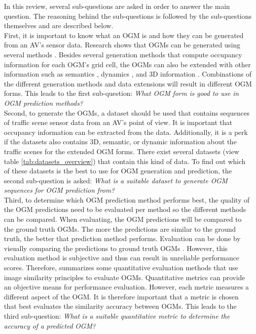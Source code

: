 In this review, several sub-questions are asked in order to answer the main question. The reasoning behind the sub-questions is followed by the sub-questions themselves and are described below. \\ 

First, it is important to know what an \gls{OGM} is and how they can be generated from an \gls{AV}'s sensor data. Research shows that \glspl{OGM} can be generated using several methods \cite{collins2007occupancy} \cite{ribo2001comparison} \cite{thrun2003learning}. Besides several generation methods that compute occupancy information for each \gls{OGM}'s grid cell, the \glspl{OGM} can also be extended with other information such as semantics \cite{lu2019monocular}, dynamics \cite{nuss2018random}, and 3D information \cite{degerman20163d}. Combinations of the different generation methods and data extensions will result in different \gls{OGM} forms. This leads to the first sub-question: \textit{What \gls{OGM} form is good to use in \gls{OGM} prediction methods?} \\

Second, to generate the \glspl{OGM}, a dataset should be used that contains sequences of traffic scene sensor data from an \gls{AV}'s point of view. It is important that occupancy information can be extracted from the data. Additionally, it is a perk if the datasets also contains 3D, semantic, or dynamic information about the traffic scenes for the extended \gls{OGM} forms. There exist several datasets (view table \ref{tab:datasets_overview}) that contain this kind of data. To find out which of these datasets is the best to use for \gls{OGM} generation and prediction, the second sub-question is asked: \textit{What is a suitable dataset to generate \gls{OGM} sequences for \gls{OGM} prediction from?} \\

Third, to determine which \gls{OGM} prediction method performs best, the quality of the \gls{OGM} predictions need to be evaluated per method so the different methods can be compared. When evaluating, the \gls{OGM} predictions will be compared to the ground truth \glspl{OGM}. The more the predictions are similar to the ground truth, the better that prediction method performs. Evaluation can be done by visually comparing the predictions to ground truth \glspl{OGM} \cite{ribo2001comparison}. However, this evaluation method is subjective and thus can result in unreliable performance scores. Therefore, \cite{collins2007occupancy} summarizes some quantitative evaluation methods that use image similarity principles to evaluate \glspl{OGM}. Quantitative metrics can provide an objective means for performance evaluation. However, each metric measures a different aspect of the \gls{OGM}. It is therefore important that a metric is chosen that best evaluates the similarity accuracy between \glspl{OGM}. This leads to the third sub-question: \textit{What is a suitable quantitative metric to determine the accuracy of a predicted \gls{OGM}?} \\

